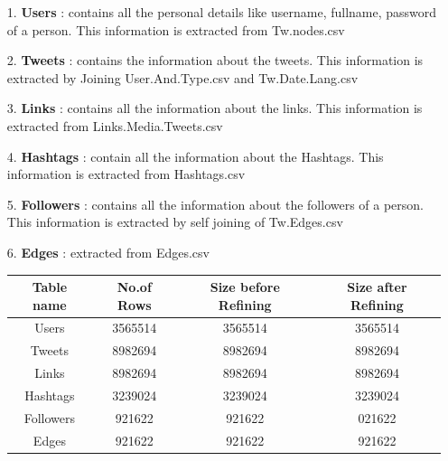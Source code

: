 \documentclass{uofa-eng-assignment}
\begin{document}
\begin{enumerate}
    \item[1.] \textbf{Users} : contains all the personal details like username, fullname, password of a person. This information is extracted from Tw.nodes.csv 
    \item[2.] \textbf{Tweets} : contains the information about the tweets. This information is extracted by Joining User.And.Type.csv and Tw.Date.Lang.csv 

    \item[3.] \textbf{Links} : contains all the information about the links. This information is extracted from Links.Media.Tweets.csv

    \item[4.] \textbf{Hashtags} : contain all the information about the Hashtags. This information is extracted from Hashtags.csv

    \item[5.] \textbf{Followers} : contains all the information about the followers of a person. This information is extracted by self joining of Tw.Edges.csv 

    \item[6.] \textbf{Edges} : extracted from Edges.csv 

    \begin{center}
    \begin{tabular}{|c | c| c |  c|}
        \hline 
        Table name & No.of Rows & Size before Refining & Size after Refining \\
        \hline 
        Users & 3565514 & 3565514 & 3565514 \\
        Tweets & 8982694 & 8982694 & 8982694 \\
        Links & 8982694 & 8982694 & 8982694 \\
        Hashtags & 3239024 & 3239024 & 3239024 \\
        Followers & 921622 & 921622 & 021622 \\
        Edges & 921622 & 921622 & 921622 \\
        \hline  
    \end{tabular}
    \end{center}

\end{enumerate}
\end{document}
